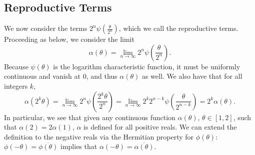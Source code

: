 \documentclass[11pt]{amsart}
\theoremstyle{remark}
\theoremstyle{definition}
\newcommand{\ie}{\textit{i.e.,}\,}
\newcommand{\eg}{\textit{e.g.,}\,}
\begin{document}

\subsection{Reproductive Terms}

We now consider the terms $2^{n} \psi\left(\frac{\theta}{2^{n}}\right)$, which we call the reproductive terms.  Proceeding as below, we consider the limit
\[
		\alpha(\theta) = \lim_{n \to \infty} 2^{n}\psi\left(\frac{\theta}{2^{n}}\right).
\]
Because $\psi(\theta)$ is the logarithm characteristic function, it must be uniformly continuous and vanish at 0, and thus $\alpha(\theta)$ as well.  We also have that for all integers $k$, 
\[
	\alpha(2^{k} \theta) = \lim_{n \to \infty} 2^{n}\psi\left(\frac{2^{k} \theta}{2^{n}}\right) =  \lim_{n \to \infty} 2^{k} 2^{n-k} \psi\left(\frac{\theta}{2^{n-k}}\right) = 2^{k} \alpha(\theta).
\]
In particular, we see that given any continuous function $\alpha(\theta)$, $\theta \in [1,2]$, such that $\alpha(2) = 2\alpha(1)$, $\alpha$ is defined for all positive reals.  We can extend the definition to the negative reals via the Hermitian property for $\phi(\theta)$: $\phi(-\theta) = \overline{\phi(\theta)}$ implies that $\alpha(-\theta) = \overline{\alpha(\theta)}$. 
\end{document}
